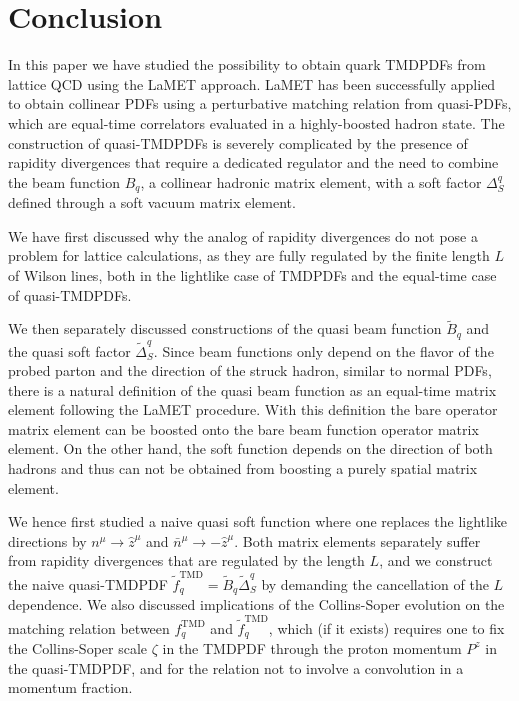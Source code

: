 \documentclass[11pt,a4paper]{article}
\newcommand{\bn}{{\bar{n}}}
\newcommand\TMD{\mathrm{TMD}}
\begin{document}
\section{Conclusion}
\label{sec:outlook}

In this paper we have studied the possibility to obtain quark TMDPDFs from lattice QCD using the LaMET approach.
LaMET has been successfully applied to obtain collinear PDFs using a perturbative matching relation from quasi-PDFs, which are equal-time correlators evaluated in a highly-boosted hadron state.
The construction of quasi-TMDPDFs is severely complicated by the presence of rapidity divergences that require a dedicated regulator and the need to combine the beam function $B_q$, a collinear hadronic matrix element, with a soft factor $\Delta_S^q$ defined through a soft vacuum matrix element.

We have first discussed why the analog of rapidity divergences do not pose a problem for lattice calculations,
as they are fully regulated by the finite length $L$ of Wilson lines, both in the lightlike case of TMDPDFs and the equal-time case of quasi-TMDPDFs.

We then separately discussed constructions of the quasi beam function $\tilde B_q$ and the quasi soft factor $\tilde \Delta_S^q$.
Since beam functions only depend on the flavor of the probed parton and the direction of the struck hadron, similar to normal PDFs, there is a natural definition of the quasi beam function as an equal-time matrix element following the LaMET procedure. With this definition the bare operator matrix element can be boosted onto the bare beam function operator matrix element.
On the other hand, the soft function depends on the direction of both hadrons and thus can not be obtained from boosting a purely spatial matrix element.
 
We hence first studied a naive quasi soft function where one replaces the lightlike directions by $n^\mu\to \hat z^\mu$ and $\bn^\mu\to -\hat z^\mu$.
Both matrix elements separately suffer from rapidity divergences that are regulated by the length $L$, and we construct the naive quasi-TMDPDF $\tilde f_q^\TMD = \tilde B_q \tilde\Delta_S^q$ by demanding the cancellation of the $L$ dependence.
We also discussed implications of the Collins-Soper evolution on the matching relation between $f_q^\TMD$ and $\tilde f_q^\TMD$, which (if it exists) requires one to fix the Collins-Soper scale $\zeta$ in the TMDPDF through the proton momentum $P^z$ in the quasi-TMDPDF, and for the relation not to involve a convolution in a momentum fraction.
\end{document}
